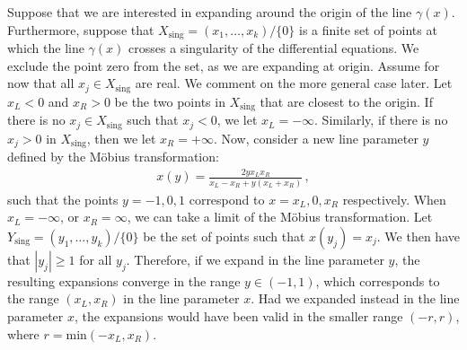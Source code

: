 \documentclass{article}
\begin{document}
Suppose that we are interested in expanding around the origin of the line $\gamma(x)$. Furthermore, suppose that $X_{\text{sing}}=(x_1,\ldots,x_k) / \{0\}$ is a finite set of points at which the line $\gamma(x)$ crosses a singularity of the differential equations. We exclude the point zero from the set, as we are expanding at origin. Assume for now that all $x_j \in X_{\text{sing}}$ are real. We comment on the more general case later. Let $x_L < 0$ and $x_R > 0$ be the two points in $X_{\text{sing}}$ that are closest to the origin. If there is no $x_j\in X_{\text{sing}}$ such that $x_j < 0$, we let $x_L = -\infty$. Similarly, if there is no $x_j>0$ in $X_\text{sing}$, then we let $x_R = +\infty$. Now, consider a new line parameter $y$ defined by the Möbius transformation:
\begin{align}
    \label{eq:mobius}
    x(y) = \frac{2 y x_{L} x_{R}}{x_{L}-x_{R}+y\left(x_{L}+x_{R}\right)}\,,
\end{align}
such that the points $y=-1,0,1$ correspond to $x=x_L,0,x_R$ respectively. When $x_L = -\infty$, or $x_R=\infty$, we can take a limit of the Möbius transformation. Let $Y_\text{sing}=(y_1,\ldots,y_k) / \{0\}$ be the set of points such that $x(y_j) = x_j$. We then have that $|y_j| \geq 1$ for all $y_j$. Therefore, if we expand in the line parameter $y$, the resulting expansions converge in the range $y \in (-1,1)$, which corresponds to the range $(x_L, x_R)$ in the line parameter $x$. Had we expanded instead in the line parameter $x$, the expansions would have been valid in the smaller range $(-r,r)$, where $r=\text{min}(-x_L,x_R)$.
\end{document}
